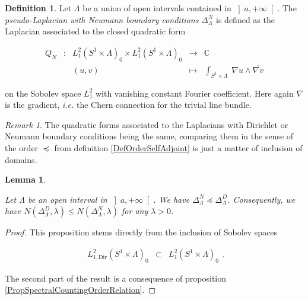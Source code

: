 \documentclass{jams-l}
\newtheorem{lemma}[theorem]{Lemma}
\theoremstyle{definition}
\newtheorem{definition}[theorem]{Definition}
\theoremstyle{remark}
\newtheorem{remark}[theorem]{Remark}
\numberwithin{equation}{section}
\begin{document}
        \begin{definition}
        
            Let $\Lambda$ be a union of open intervals contained in $\left] a, + \infty \right[$. The \textit{pseudo-Laplacian with Neumann boundary conditions} $\Delta^N_{\Lambda}$ is defined as the Laplacian associated to the closed quadratic form
            
            \[ \begin{array}{lllll}
                    Q_N & : & L_1^2 \left( S^1 \times \Lambda \right)_0 \times L_1^2 \left( S^1 \times \Lambda \right)_0 & \longrightarrow & \mathbb{C} \\[0.5em]
                    
                    && \left( u,v \right) & \longmapsto & \int_{S^1 \times \Lambda} \; \nabla u \wedge \overline{\nabla v}
                \end{array} \]
                
            \noindent on the Sobolev space $L_1^2$ with vanishing constant Fourier coefficient. Here again $\nabla$ is the gradient, \textit{i.e.} the Chern connection for the trivial line bundle.
        
        \end{definition}
        
        \begin{remark}
        
            The quadratic forms associated to the Laplacians with Dirichlet or Neumann boundary conditions being the same, comparing them in the sense of the order $\preccurlyeq$ from definition \ref{DefOrderSelfAdjoint} is just a matter of inclusion of domains.
        
        \end{remark}
        
        \begin{lemma}
        \label{LemDNBracketing}
        
            Let $\Lambda$ be an open interval in $\left] a, + \infty \right[$. We have $\Delta^N_{\Lambda} \preccurlyeq \Delta^D_{\Lambda}$. Consequently, we have $N \left( \Delta^D_{\Lambda}, \lambda \right) \leqslant N \left( \Delta^N_{\Lambda}, \lambda \right)$ for any $\lambda > 0$.
        
        \end{lemma}
        
        \begin{proof}
        
            This proposition stems directly from the inclusion of Sobolev spaces
            
            \[ \begin{array}{lll}
                    L_{1,\mathrm{Dir}}^2 \left( S^1 \times \Lambda \right)_0 & \subset & L_1^2 \left( S^1 \times \Lambda \right)_0
                \end{array} . \]
            
            \noindent The second part of the result is a consequence of proposition \ref{PropSpectralCountingOrderRelation}.
        
        \end{proof}
        
\end{document}
